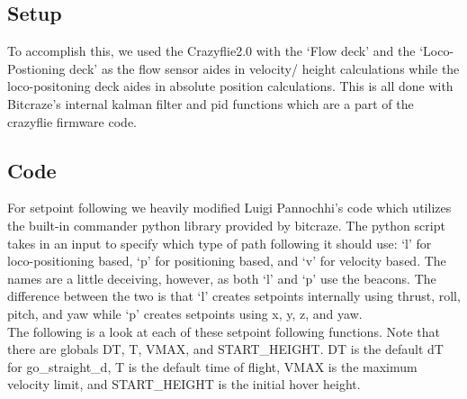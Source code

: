 \documentclass[]{article}
\begin{document}
\subsection{Setup}

\noindent To accomplish this, we used the Crazyflie2.0 with the `Flow deck' %
 and the `Loco-Postioning deck' %
 as the flow sensor aides in velocity/ height calculations while the loco-positoning deck aides in absolute position calculations. This is all done with Bitcraze's internal kalman filter and pid functions which are a part of the crazyflie firmware code.
 
\subsection{Code}

\noindent For setpoint following we heavily modified Luigi Pannochhi's code which utilizes the built-in commander python library provided by bitcraze. The python script takes in an input to specify which type of path following it should use: `l' for loco-positioning based, `p' for positioning based, and `v' for velocity based. The names are a little deceiving, however, as both `l' and `p' use the beacons. The difference between the two is that `l' creates setpoints internally using thrust, roll, pitch, and yaw while `p' creates setpoints using x, y, z, and yaw.\\

\noindent The following is a look at each of these setpoint following functions. Note that there are globals DT, T, VMAX, and START\_HEIGHT. DT is the default dT for go\_straight\_d, T is the default time of flight, VMAX is the maximum velocity limit, and START\_HEIGHT is the initial hover height.
\end{document}
